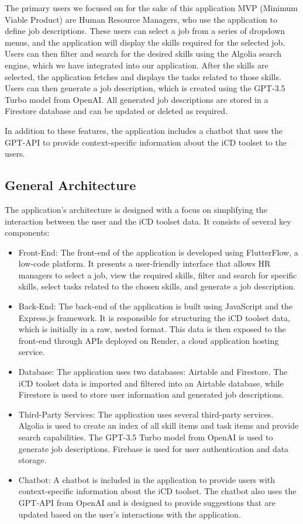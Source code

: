 The primary users we focused on for the sake of this application MVP (Minimum Viable Product) are Human Resource Managers, who use the application to define job descriptions. These users can select a job from a series of dropdown menus, and the application will display the skills required for the selected job. Users can then filter and search for the desired skills using the Algolia search engine, which we have integrated into our application. After the skills are selected, the application fetches and displays the tasks related to those skills. Users can then generate a job description, which is created using the GPT-3.5 Turbo model from OpenAI. All generated job descriptions are stored in a Firestore database and can be updated or deleted as required.

In addition to these features, the application includes a chatbot that uses the GPT-API to provide context-specific information about the iCD toolset to the users.


\subsection{General Architecture}

The application's architecture is designed with a focus on simplifying the interaction between the user and the iCD toolset data. It consists of several key components:

\begin{itemize}
    \item Front-End: The front-end of the application is developed using FlutterFlow, a low-code platform. It presents a user-friendly interface that allows HR managers to select a job, view the required skills, filter and search for specific skills, select tasks related to the chosen skills, and generate a job description. 
    \item Back-End: The back-end of the application is built using JavaScript and the Express.js framework. It is responsible for structuring the iCD toolset data, which is initially in a raw, nested format. This data is then exposed to the front-end through APIs deployed on Render, a cloud application hosting service.
    \item Database: The application uses two databases: Airtable and Firestore. The iCD toolset data is imported and filtered into an Airtable database, while Firestore is used to store user information and generated job descriptions.
    \item Third-Party Services: The application uses several third-party services. Algolia is used to create an index of all skill items and task items and provide search capabilities. The GPT-3.5 Turbo model from OpenAI is used to generate job descriptions. Firebase is used for user authentication and data storage.
    \item Chatbot: A chatbot is included in the application to provide users with context-specific information about the iCD toolset. The chatbot also uses the GPT-API from OpenAI and is designed to provide suggestions that are updated based on the user's interactions with the application.
\end{itemize}


